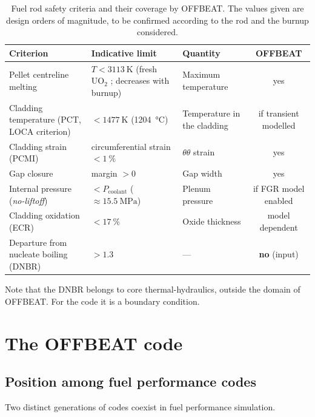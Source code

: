 \documentclass[12pt,a4paper]{report}
\begin{document}
\begin{table}[htbp]
\centering
\caption[Safety criteria and coverage by OFFBEAT]{Fuel rod safety criteria and
their coverage by OFFBEAT. The values given are design orders of magnitude, to
be confirmed according to the rod and the burnup considered.}
\label{tab:criteres}
\small
\begin{tabularx}{\textwidth}{@{}>{\raggedright\arraybackslash}p{4.1cm}
                                >{\raggedright\arraybackslash}p{3.9cm}
                                X
                                c@{}}
\toprule
\textbf{Criterion} & \textbf{Indicative limit} & \textbf{Quantity} &
\textbf{OFFBEAT}\\
\midrule
Pellet centreline melting & $T < \SI{3113}{\kelvin}$ (fresh $\mathrm{UO_2}$ ;
  decreases with burnup) & Maximum temperature & yes\\
Cladding temperature (PCT, LOCA criterion) & $< \SI{1477}{\kelvin}$
  (\SI{1204}{\celsius}) & Temperature in the cladding & if transient modelled\\
Cladding strain (PCMI) & circumferential strain $< \SI{1}{\percent}$ &
  $\theta\theta$ strain & yes\\
Gap closure & margin $>0$ & Gap width & yes\\
Internal pressure (\textit{no-liftoff}) & $< P_{\text{coolant}}$
  ($\approx\SI{15.5}{\mega\pascal}$) & Plenum pressure & if FGR model enabled\\
Cladding oxidation (ECR) & $< \SI{17}{\percent}$ & Oxide thickness &
  model dependent\\
Departure from nucleate boiling (DNBR) & $> 1.3$ & --- & \textbf{no} (input)\\
\bottomrule
\end{tabularx}
\end{table}

Note that the DNBR belongs to core thermal-hydraulics, outside the domain of
OFFBEAT. For the code it is a boundary condition.

\section{The OFFBEAT code}

\subsection{Position among fuel performance codes}

Two distinct generations of codes coexist in fuel performance simulation.
\end{document}
